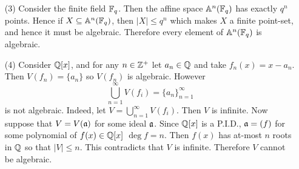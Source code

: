 \begin{example}
\begin{enumerate}
    \item[(3)] Consider the finite field $\mathbb{F}_q$. Then the affine space
       $\mathbb{A}^n(\mathbb{F}_q)$ has exactly $q^n$ points. Hence if $X \subseteq
       \mathbb{A}^n(\mathbb{F}_q)$, then $|X| \leq q^n$ which makes $X$ a finite
       point-set, and hence it must be algebraic. Therefore every
       element of $\mathbb{A}^n(\mathbb{F}_q)$ is algebraic.

     \item[(4)] Consider $\mathbb{Q}[x]$, and for any $n \in \mathbb{Z}^+$ let $a_n
       \in \mathbb{Q}$ and take $f_n(x)=x-a_n$. Then $V(f_n)=\{a_n\}$ so
       $V(f_n)$ is algebraic. However
       \begin{equation*}
         \bigcup_{n=1}^\infty{V(f_i)}=\{a_n\}_{n=1}^\infty
       \end{equation*}
       is not algebraic. Indeed, let $V=\bigcup_{n=1}^\infty{V(f_i)}$.
       Then $V$ is infinite. Now suppose that $V=V(\mathfrak{a})$ for some
       ideal $\mathfrak{a}$. Since $\mathbb{Q}[x]$ is a P.I.D., $\mathfrak{a}=(f)$ for some
       polynomial of $f(x) \in \mathbb{Q}[x]$ $\deg{f}=n$. Then $f(x)$ has
       at-most $n$ roots in $\mathbb{Q}$ so that $|V| \leq n$. This
       contradicts that $V$ is infinite. Therefore $V$ cannot be
       algebraic.
  \end{enumerate}
\end{example}
